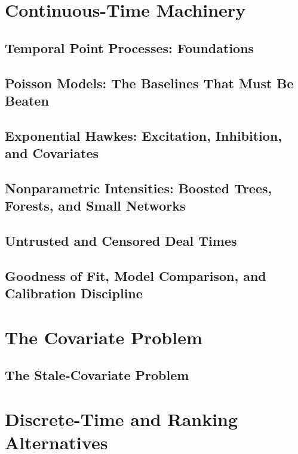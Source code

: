 \documentclass[11pt,a4paper,twoside,openany]{book}
\theoremstyle{plain}
\theoremstyle{definition}
\theoremstyle{remark}
\begin{document}
\part{Continuous-Time Machinery}
\chapter{Temporal Point Processes: Foundations}\label{ch:foundations}


\chapter{Poisson Models: The Baselines That Must Be Beaten}\label{ch:poisson}


\chapter{Exponential Hawkes: Excitation, Inhibition, and Covariates}\label{ch:hawkes}


\chapter{Nonparametric Intensities: Boosted Trees, Forests, and Small Networks}\label{ch:nonparam}


\chapter{Untrusted and Censored Deal Times}\label{ch:censoring}


\chapter{Goodness of Fit, Model Comparison, and Calibration Discipline}\label{ch:gof}


\part{The Covariate Problem}
\chapter{The Stale-Covariate Problem}\label{ch:stale}


\part{Discrete-Time and Ranking Alternatives}
\end{document}
